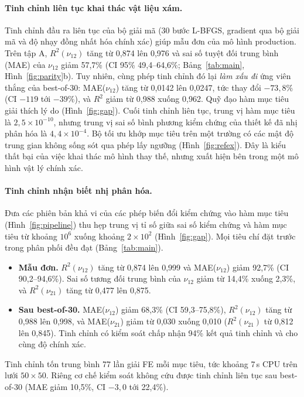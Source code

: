 \documentclass[a4paper,11pt]{article}
\newcommand{\nuot}{\nu_{12}}
\newcommand{\nuto}{\nu_{21}}
\newcommand{\RR}{R^2}
\begin{document}
\paragraph{Tinh chỉnh liên tục khai thác vật liệu xám.}
Tinh chỉnh đầu ra liên tục của bộ giải mã (30 bước L-BFGS, gradient qua bộ
giải mã và độ nhạy đồng nhất hóa chính xác) giúp mẫu đơn của mô hình
production. Trên tập A, $\RR(\nuot)$ tăng từ 0,874 lên 0,976 và sai số tuyệt
đối trung bình (MAE) của $\nuot$ giảm 57,7\% (CI 95\% 49,4--64,6\%;
Bảng~\ref{tab:main}, Hình~\ref{fig:parity}b). Tuy nhiên, cùng phép tinh chỉnh
đó lại \emph{làm xấu đi} ứng viên thắng của best-of-30: MAE($\nuot$) tăng từ
0,0142 lên 0,0247, tức thay đổi $-73,8\%$ (CI $-119$ tới $-39\%$), và $\RR$
giảm từ 0,988 xuống 0,962. Quỹ đạo hàm mục tiêu giải thích lý do
(Hình~\ref{fig:gap}). Cuối tinh chỉnh liên tục, trung vị hàm mục tiêu là
$2,5\times10^{-10}$, nhưng trung vị sai số bình phương kiểm chứng của thiết
kế đã nhị phân hóa là $4,4\times10^{-4}$. Bộ tối ưu khớp mục tiêu trên một
trường có các mật độ trung gian không sống sót qua phép lấy ngưỡng
(Hình~\ref{fig:refex}). Đây là kiểu thất bại của việc khai thác mô hình thay
thế, nhưng xuất hiện bên trong một mô hình vật lý chính xác.

\paragraph{Tinh chỉnh nhận biết nhị phân hóa.}
Đưa các phiên bản khả vi của các phép biến đổi kiểm chứng vào hàm mục tiêu
(Hình~\ref{fig:pipeline}) thu hẹp trung vị tỉ số giữa sai số kiểm chứng và
hàm mục tiêu từ khoảng $10^{6}$ xuống khoảng $2\times10^{2}$
(Hình~\ref{fig:gap}). Mọi tiêu chí đặt trước trong phân phối đều đạt
(Bảng~\ref{tab:main}).
\begin{itemize}
\item \textbf{Mẫu đơn.} $\RR(\nuot)$ tăng từ 0,874 lên 0,999 và MAE($\nuot$)
giảm 92,7\% (CI 90,2--94,6\%). Sai số tương đối trung bình của $\nuot$ giảm
từ 14,4\% xuống 2,3\%, và $\RR(\nuto)$ tăng từ 0,477 lên 0,875.
\item \textbf{Sau best-of-30.} MAE($\nuot$) giảm 68,3\% (CI 59,3--75,8\%),
$\RR(\nuot)$ tăng từ 0,988 lên 0,998, và MAE($\nuto$) giảm từ 0,030 xuống
0,010 ($\RR(\nuto)$ từ 0,812 lên 0,845). Tinh chỉnh có kiểm soát chấp nhận
94\% kết quả tinh chỉnh và cho cùng độ chính xác.
\end{itemize}
Tinh chỉnh tốn trung bình 77 lần giải FE mỗi mục tiêu, tức khoảng 7\,s CPU
trên lưới $50\times50$. Riêng cơ chế kiểm soát không cứu được tinh chỉnh liên
tục sau best-of-30 (MAE giảm 10,5\%, CI $-3,0$ tới 22,4\%).
\end{document}
